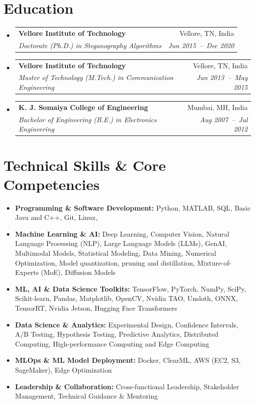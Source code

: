 \documentclass[a4paper,11pt]{article}
\makeatletter
\newcommand{\resumeSubheading}[4]{
  \vspace{-1pt}\item
    \begin{tabular*}{0.97\textwidth}[t]{l@{\extracolsep{\fill}}r}
      \textbf{#1} & #2 \\
      \textit{\small#3} & \textit{\small #4} \\
    \end{tabular*}\vspace{-5pt}
}
\newcommand{\resumeSubHeadingListStart}{\begin{itemize}[leftmargin=*]}
\newcommand{\resumeSubHeadingListEnd}{\end{itemize}}
\makeatother
\begin{document}
\section{Education}
  \resumeSubHeadingListStart
    \resumeSubheading
      {Vellore Institute of Technology}{Vellore, TN, India}
      {Doctorate (Ph.D.) in Steganography Algorithms}{Jun 2015~--~Dec 2020}
    \resumeSubheading
      {Vellore Institute of Technology}{Vellore, TN, India}
      {Master of Technology (M.Tech.) in Communication Engineering}{Jun 2013~--~May 2015}
    \resumeSubheading
      {K. J. Somaiya College of Engineering}{Mumbai, MH, India}
      {Bachelor of Engineering (B.E.) in Electronics Engineering}{Aug 2007~--~Jul 2012}
  \resumeSubHeadingListEnd

\section{Technical Skills \& Core Competencies}
	\begin{itemize}[leftmargin=*, itemsep = -2pt]
    \item{\textbf{Programming \& Software Development:} Python, MATLAB, SQL, Basic Java and C++, Git, Linux,}
    \item{\textbf{Machine Learning \& AI:} Deep Learning, Computer Vision, Natural Language Processing (NLP), Large Language Models (LLMs), GenAI, Multimodal Models, Statistical Modeling, Data Mining, Numerical Optimization, Model quantization, pruning and distillation, Mixture-of-Experts (MoE), Diffusion Models} 
		\item{\textbf{ML, AI \& Data Science Toolkits:} TensorFlow, PyTorch, NumPy, SciPy, Scikit-learn, Pandas, Matplotlib, OpenCV, Nvidia TAO, Unsloth, ONNX, TensorRT, Nvidia Jetson, Hugging Face Transformers}
		\item {\textbf{Data Science \& Analytics:} Experimental Design, Confidence Intervals, A/B Testing, Hypothesis Testing, Predictive Analytics, Distributed Computing, High-performance Computing and Edge Computing}
		\item{\textbf{MLOps \& ML Model Deployment:} Docker, ClearML, AWS (EC2, S3, SageMaker), Edge Optimization}
    \item{\textbf{Leadership \& Collaboration:} Cross-functional Leadership, Stakeholder Management, Technical Guidance \& Mentoring}
    
	\end{itemize}
\end{document}
